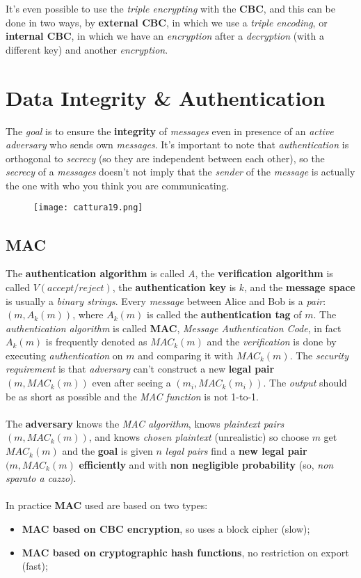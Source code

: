 \documentclass{article}
\begin{document}
It's even possible to use the \emph{triple encrypting} with the \textbf{CBC}, and this can be done in two ways, by \textbf{external CBC}, in which we use a \emph{triple encoding}, or \textbf{internal CBC}, in which we have an \emph{encryption} after a \emph{decryption} (with a different key) and another \emph{encryption}. 
\section{Data Integrity \& Authentication}
The \emph{goal} is to ensure the \textbf{integrity} of \emph{messages} even in presence of an \emph{active adversary} who sends own \emph{messages}. It's important to note that \emph{authentication} is orthogonal to \emph{secrecy} (so they are independent between each other), so the \emph{secrecy} of a \emph{messages} doesn't not imply that the \emph{sender} of the \emph{message} is actually the one with who you think you are communicating. 
\begin{figure}[H]
  \centering
  \texttt{[image: cattura19.png]}
\end{figure}
\subsection{MAC}
The \textbf{authentication algorithm} is called $A$, the \textbf{verification algorithm} is called $V(accept/reject)$, the \textbf{authentication key} is $k$, and the \textbf{message space} is usually a \emph{binary strings}. Every \emph{message} between Alice and Bob is a \emph{pair}: $(m,A_k(m))$, where $A_k(m)$ is called the \textbf{authentication tag} of $m$. The \emph{authentication algorithm} is called \textbf{MAC}, \emph{Message Authentication Code}, in fact $A_k(m)$ is frequently denoted as $MAC_k(m)$ and the \emph{verification} is done by executing \emph{authentication} on $m$ and comparing it with $MAC_k(m)$. The \emph{security requirement} is that \emph{adversary} can't construct a new \textbf{legal pair} $(m,MAC_k(m))$ even after seeing a $(m_i,MAC_k(m_i))$. The \emph{output} should be as short as possible and the \emph{MAC function} is not 1-to-1. \\\\
The \textbf{adversary} knows the \emph{MAC algorithm}, knows \emph{plaintext pairs} $(m,MAC_k(m))$, and knows \emph{chosen plaintext} (unrealistic) so choose $m$ get $MAC_k(m)$ and the \textbf{goal} is given $n$ \emph{legal pairs} find a \textbf{new legal pair} $(m,MAC_k(m)$ \textbf{efficiently} and with \textbf{non negligible probability} (so, \emph{non sparato a cazzo}). \\\\
In practice \textbf{MAC} used are based on two types:
\begin{itemize}
\item \textbf{MAC based on CBC encryption}, so uses a block cipher (slow);
\item \textbf{MAC based on cryptographic hash functions}, no restriction on export (fast);
\end{itemize}
\end{document}
